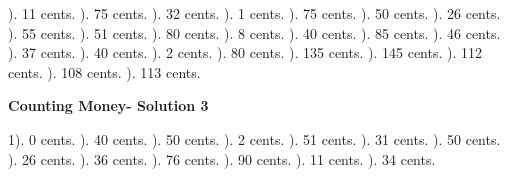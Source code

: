 \documentclass{article}%
\begin{document}
). 11 cents.%
). 75 cents.%
). 32 cents.%
). 1 cents.%
). 75 cents.%
). 50 cents.%
). 26 cents.%
). 55 cents.%
). 51 cents.%
). 80 cents.%
). 8 cents.%
). 40 cents.%
). 85 cents.%
). 46 cents.%
). 37 cents.%
). 40 cents.%
). 2 cents.%
). 80 cents.%
). 135 cents.%
). 145 cents.%
). 112 cents.%
). 108 cents.%
). 113 cents.%
\newline%
\newpage%
\large%
\begin{center}%
\textbf{Counting Money- Solution 3}%
\newline%
\end{center} \normalsize%
1). 0 cents.%
). 40 cents.%
). 50 cents.%
). 2 cents.%
). 51 cents.%
). 31 cents.%
). 50 cents.%
). 26 cents.%
). 36 cents.%
). 76 cents.%
). 90 cents.%
). 11 cents.%
). 34 cents.%
\newline%
\end{document}
